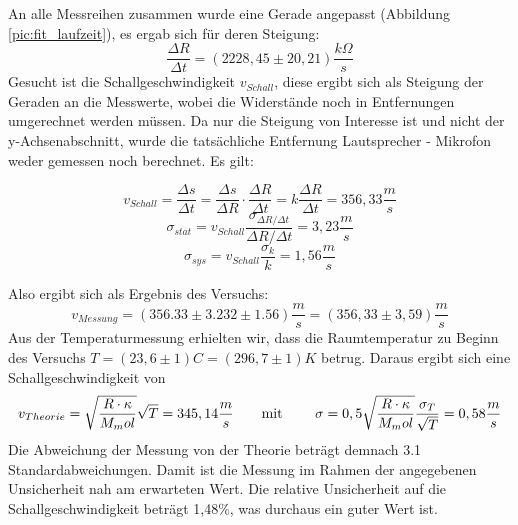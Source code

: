 \documentclass[12pt,a4paper]{article}
\begin{document}
	An alle Messreihen zusammen wurde eine Gerade angepasst (Abbildung \ref{pic:fit_laufzeit}), es ergab sich für deren Steigung:
	\begin{equation}
	\frac{\Delta R}{\Delta t} = (2228,45 \pm 20,21) \frac{k\Omega}{s}
	\end{equation} 
	Gesucht ist die Schallgeschwindigkeit $v_{Schall}$, diese ergibt sich als Steigung der Geraden an die Messwerte, wobei die Widerstände noch in Entfernungen umgerechnet werden müssen. Da nur die Steigung von Interesse ist und nicht der y-Achsenabschnitt, wurde die tatsächliche  Entfernung Lautsprecher - Mikrofon weder gemessen noch berechnet. Es gilt:
	
	\begin{equation}
	v_{Schall} = \frac{\Delta s}{\Delta t} = \frac{\Delta s}{\Delta R} \cdot \frac{\Delta R}{\Delta t} = k \frac{\Delta R}{\Delta t} = 356,33 \frac{m}{s}
	\end{equation}
	\begin{equation}
	\sigma_{stat} = v_{Schall} \frac{\sigma _{\Delta R / \Delta t}}{\Delta R / \Delta t} = 3,23 \frac{m}{s}
	\end{equation}
	\begin{equation}
	\sigma_{sys} = v_{Schall} \frac{\sigma _k}{k} = 1,56 \frac{m}{s}
	\end{equation}
	
	Also ergibt sich als Ergebnis des Versuchs:
	\begin{equation}
	v_{Messung} = (356.33 \pm 3.232 \pm 1.56)\frac{m}{s} = (356,33\pm 3,59) \frac{m}{s}
	\end{equation}
	Aus der Temperaturmessung erhielten wir, dass die Raumtemperatur zu Beginn des Versuchs $T = (23,6 \pm 1)C = (296,7 \pm 1)K$ betrug.
	Daraus ergibt sich eine Schallgeschwindigkeit von
	\begin{equation}
	v_{Theorie} =\sqrt{\frac{R\cdot\kappa}{M_mol}}\sqrt{T} = 345,14 \frac{m}{s} \text{\qquad mit \qquad}
	\sigma = 0,5 \sqrt{\frac{R\cdot\kappa}{M_mol}} \frac{\sigma_T}{\sqrt{T}} = 0,58 \frac{m}{s}
	\end{equation}
	Die Abweichung der Messung von der Theorie beträgt demnach 3.1 Standardabweichungen. Damit ist die Messung im Rahmen der angegebenen Unsicherheit nah am erwarteten Wert. Die relative Unsicherheit auf die Schallgeschwindigkeit beträgt 1,48\%, was durchaus ein guter Wert ist.
	
\end{document}
